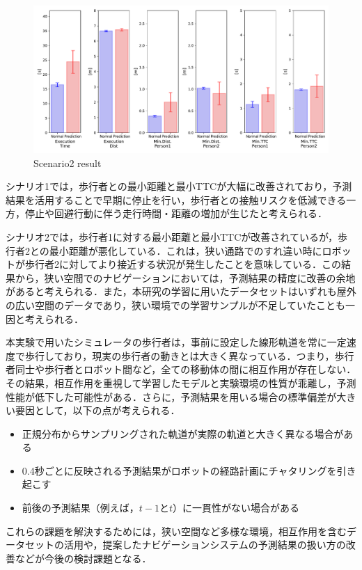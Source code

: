 \begin{figure}[H]
  \centering
 \includegraphics[keepaspectratio, scale=0.44]
      {images/scenario2_result.pdf}
  \caption{Scenario2 result}
 \label{Fig:scenario2-result}
\end{figure} 

\newpage

シナリオ1では，歩行者との最小距離と最小TTCが大幅に改善されており，予測結果を活用することで早期に停止を行い，歩行者との接触リスクを低減できる一方，停止や回避行動に伴う走行時間・距離の増加が生じたと考えられる．

シナリオ2では，歩行者1に対する最小距離と最小TTCが改善されているが，歩行者2との最小距離が悪化している．これは，狭い通路でのすれ違い時にロボットが歩行者2に対してより接近する状況が発生したことを意味している．この結果から，狭い空間でのナビゲーションにおいては，予測結果の精度に改善の余地があると考えられる．また，本研究の学習に用いたデータセットはいずれも屋外の広い空間のデータであり，狭い環境での学習サンプルが不足していたことも一因と考えられる．

本実験で用いたシミュレータの歩行者は，事前に設定した線形軌道を常に一定速度で歩行しており，現実の歩行者の動きとは大きく異なっている．つまり，歩行者同士や歩行者とロボット間など，全ての移動体の間に相互作用が存在しない．その結果，相互作用を重視して学習したモデルと実験環境の性質が乖離し，予測性能が低下した可能性がある．さらに，予測結果を用いる場合の標準偏差が大きい要因として，以下の点が考えられる．
\begin{itemize}
  \item 正規分布からサンプリングされた軌道が実際の軌道と大きく異なる場合がある
  \item 0.4秒ごとに反映される予測結果がロボットの経路計画にチャタリングを引き起こす
  \item 前後の予測結果（例えば，$t-1\text{と}t$）に一貫性がない場合がある
\end{itemize}
これらの課題を解決するためには，狭い空間など多様な環境，相互作用を含むデータセットの活用や，提案したナビゲーションシステムの予測結果の扱い方の改善などが今後の検討課題となる．

\newpage
